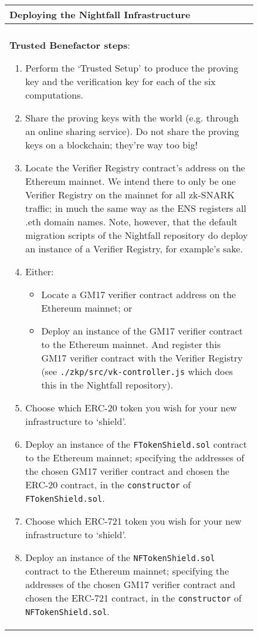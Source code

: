 \begin{figure}[ht]
	\begin{center}
		\begin{framed}
      \begin{tabular}{p{16cm}}	
        \textbf{Deploying the Nightfall Infrastructure} \\ \midrule
         \\
        \textbf{Trusted Benefactor steps}:
        \begin{enumerate}
				  \item Perform the `Trusted Setup' to produce the proving key and the verification key for each of the six computations.
				  \item Share the proving keys with the world (e.g. through an online sharing service). Do not share the proving keys on a blockchain; they're way too big!
				  \item Locate the Verifier Registry contract's address on the Ethereum mainnet. We intend there to only be one Verifier Registry on the mainnet for all zk-SNARK traffic; in much the same way as the ENS registers all .eth domain names. Note, however, that the default migration scripts of the Nightfall repository do deploy an instance of a Verifier Registry, for example's sake.
          \item Either:
          \begin{itemize}
            \item Locate a GM17 verifier contract address on the Ethereum mainnet; or
            \item Deploy an instance of the GM17 verifier contract to the Ethereum mainnet. And register this GM17 verifier contract with the Verifier Registry (see \texttt{./zkp/src/vk-controller.js} which does this in the Nightfall repository).
          \end{itemize}
          \item Choose which ERC-20 token you wish for your new infrastructure to `shield'.
          \item Deploy an instance of the \texttt{FTokenShield.sol} contract to the Ethereum mainnet; specifying the addresses of the chosen GM17 verifier contract and chosen the ERC-20 contract, in the \texttt{constructor} of \texttt{FTokenShield.sol}.
          \item Choose which ERC-721 token you wish for your new infrastructure to `shield'.
          \item Deploy an instance of the \texttt{NFTokenShield.sol} contract to the Ethereum mainnet; specifying the addresses of the chosen GM17 verifier contract and chosen the ERC-721 contract, in the \texttt{constructor} of \texttt{NFTokenShield.sol}.

\end{enumerate}
\end{tabular}
\end{framed}
\end{center}
\end{figure}
